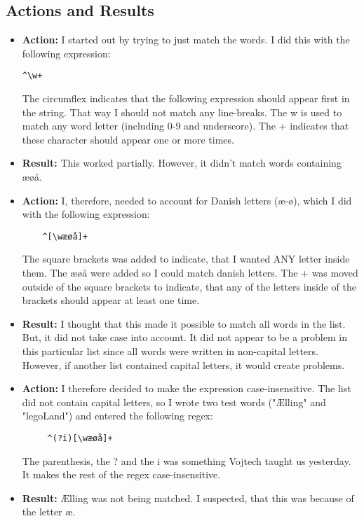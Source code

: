 \documentclass{article}
\begin{document}
\subsection{Actions and Results}
\begin{itemize}

\item \textbf{Action:} I started out by trying to just match the words. I did this with the following expression:
\begin{verbatim}
^\w+
\end{verbatim}
The circumflex indicates that the following expression should appear first in the string. That way I should not match any line-breaks. The  w is used to match any word letter (including 0-9 and underscore). The + indicates that these character should appear one or more times.
\item \textbf{Result:} This worked partially. However, it didn't match words containing æøå.

\item\textbf{Action:} I, therefore, needed to account for Danish letters (æ-ø), which I did with the following expression:
\begin{verbatim}
    ^[\wæøå]+
\end{verbatim}
The square brackets was added to indicate, that I wanted ANY letter inside them. The æøå were added so I could match danish letters. The + was moved outside of the square brackets to indicate, that any of the letters inside of the brackets should appear at least one time.
\item \textbf{Result:} I thought that this made it possible to match all words in the list. But, it did not take case into account. It did not appear to be a problem in this particular list since all words were written in non-capital letters. However, if another list contained capital letters, it would create problems.

\item \textbf{Action:} I therefore decided to make the expression case-insensitive. The list did not contain capital letters, so I wrote two test words ("Ælling" and "legoLand") and entered the following regex:
\begin{verbatim}
     ^(?i)[\wæøå]+
\end{verbatim}
The parenthesis, the ? and the i was something Vojtech taught us yesterday. It makes the rest of the regex case-insensitive. 
\item \textbf{Result:} Ælling was not being matched. I suspected, that this was because of the letter æ. 


\end{itemize}
\end{document}
